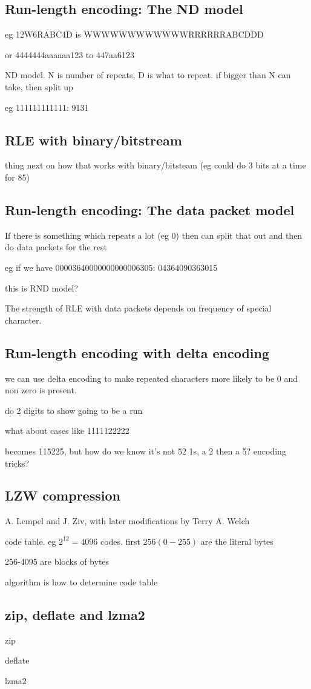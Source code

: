 
\subsection{Run-length encoding: The ND model}

eg 12W6RABC4D is WWWWWWWWWWWWRRRRRRABCDDD

or 4444444aaaaaa123 to 447aa6123

ND model. N is number of repeats, D is what to repeat. if bigger than N can take, then split up

eg 111111111111: 9131

\subsection{RLE with binary/bitstream}

thing next on how that works with binary/bitsteam (eg could do 3 bits at a time for 85)

\subsection{Run-length encoding: The data packet model}

If there is something which repeats a lot (eg 0) then can split that out and then do data packets for the rest

eg if we have 00003640000000000006305: 04364090363015

this is RND model?

The strength of RLE with data packets depends on frequency of special character.

\subsection{Run-length encoding with delta encoding}

we can use delta encoding to make repeated characters more likely to be 0 and non zero is present.

do 2 digits to show going to be a run

what about cases like 1111122222

becomes 115225, but how do we know it's not 52 1s, a 2 then a 5? encoding tricks?

\subsection{LZW compression}

A. Lempel and J. Ziv, with later modifications by Terry A. Welch

code table. eg \(2^12 = 4096\) codes. first \(256 (0-255)\) are the literal bytes


256-4095 are blocks of bytes

algorithm is how to determine code table

\subsection{zip, deflate and lzma2}

zip

deflate

lzma2


